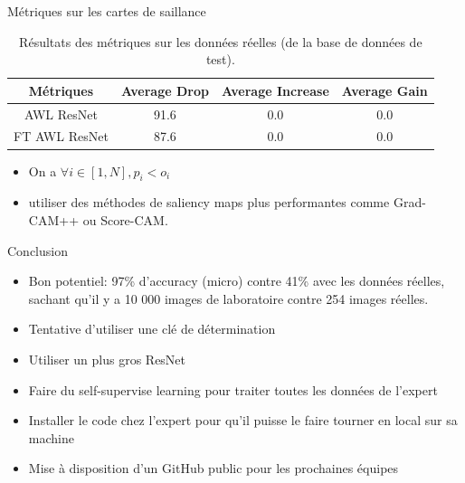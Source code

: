 \documentclass[11pt]{beamer}
\begin{document}
\begin{frame}{Métriques sur les cartes de saillance}
    \begin{table}[ht]
        \centering
        \begin{tabular}{cccc}
            \toprule
            Métriques & Average Drop & Average Increase & Average Gain \\
            \midrule
            AWL ResNet & 91.6 & 0.0& 0.0\\
            FT AWL ResNet & 87.6 & 0.0 & 0.0\\
            \bottomrule
            \end{tabular}
        \caption{Résultats des métriques sur les données réelles (de la base de données de test).}
        \label{tab:saliency_results}
    \end{table}

    \begin{itemize}
        \item On a $\forall i \in [1, N], p_i < o_i$
        \item utiliser des méthodes de saliency maps plus performantes comme Grad-CAM++ ou Score-CAM.
    \end{itemize}
\end{frame}

\begin{frame}{Conclusion}
    \begin{itemize}
        \item Bon potentiel: 97\% d'accuracy (micro) contre 41\% avec les données réelles, sachant qu'il y a 10 000 images de laboratoire contre 254 images réelles.
        \item Tentative d'utiliser une clé de détermination
        \item Utiliser un plus gros ResNet
        \item Faire du self-supervise learning pour traiter toutes les données de l'expert
        \item Installer le code chez l'expert pour qu'il puisse le faire tourner en local sur sa machine
        \item Mise à disposition d'un GitHub public pour les prochaines équipes
    \end{itemize}
\end{frame}
\end{document}
